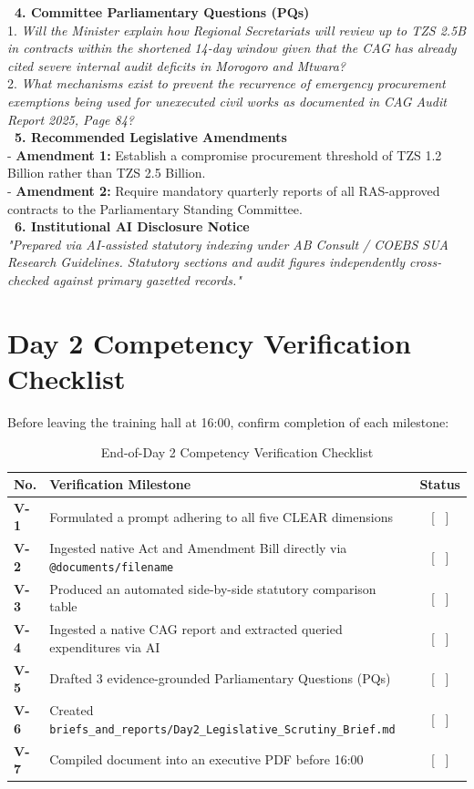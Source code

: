 \documentclass[11pt, a4paper]{report}
\begin{document}
\begin{tcolorbox}[colback=lightgrey, colframe=bordergrey, title=\textbf{Deliverable 2 Preview: \texttt{Day2\_Legislative\_Scrutiny\_Brief.md}}]
\textcolor{tanzaniablue}{\textbf{\ 4. Committee Parliamentary Questions (PQs)}}\\
1. \textit{Will the Minister explain how Regional Secretariats will review up to TZS 2.5B in contracts within the shortened 14-day window given that the CAG has already cited severe internal audit deficits in Morogoro and Mtwara?}\\
2. \textit{What mechanisms exist to prevent the recurrence of emergency procurement exemptions being used for unexecuted civil works as documented in CAG Audit Report 2025, Page 84?}\\[0.2cm]
\textcolor{tanzaniablue}{\textbf{\ 5. Recommended Legislative Amendments}}\\
- \textbf{Amendment 1:} Establish a compromise procurement threshold of TZS 1.2 Billion rather than TZS 2.5 Billion.\\
- \textbf{Amendment 2:} Require mandatory quarterly reports of all RAS-approved contracts to the Parliamentary Standing Committee.\\[0.2cm]
\textcolor{tanzaniablue}{\textbf{\ 6. Institutional AI Disclosure Notice}}\\
\textit{"Prepared via AI-assisted statutory indexing under AB Consult / COEBS SUA Research Guidelines. Statutory sections and audit figures independently cross-checked against primary gazetted records."}
\end{tcolorbox}

\section{Day 2 Competency Verification Checklist}
Before leaving the training hall at 16:00, confirm completion of each milestone:

\begin{table}[htbp]
\centering
\caption{End-of-Day 2 Competency Verification Checklist}
\vspace{0.2cm}
\begin{tabular}{@{}>{\bfseries}p{1.2cm}p{10cm}c@{}}
\toprule
No. & Verification Milestone & Status \\
\midrule
V-1 & Formulated a prompt adhering to all five CLEAR dimensions & [ \ ] \\
V-2 & Ingested native Act and Amendment Bill directly via \texttt{@documents/filename} & [ \ ] \\
V-3 & Produced an automated side-by-side statutory comparison table & [ \ ] \\
V-4 & Ingested a native CAG report and extracted queried expenditures via AI & [ \ ] \\
V-5 & Drafted 3 evidence-grounded Parliamentary Questions (PQs) & [ \ ] \\
V-6 & Created \texttt{briefs\_and\_reports/Day2\_Legislative\_Scrutiny\_Brief.md} & [ \ ] \\
V-7 & Compiled document into an executive PDF before 16:00 & [ \ ] \\
\bottomrule
\end{tabular}
\end{table}
\end{document}
